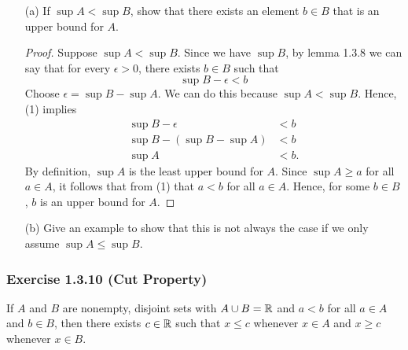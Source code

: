 \begin{enumerate}
    
    \item[(a)] If \( \sup A < \sup B \), show that there exists an element \( b \in B \) that is an upper bound for \( A \). 
    \begin{proof}
        Suppose \( \sup A < \sup B \). Since we have \( \sup B \), by lemma 1.3.8 we can say that for every \( \epsilon > 0 \), there exists \( b \in B \) such that 
        \[ \sup B - \epsilon < b \tag{1} \] 
        Choose \( \epsilon = \sup B - \sup A \). We can do this because \( \sup A < \sup B \). Hence, (1) implies 
        \begin{align*} 
            \sup B - \epsilon &< b \\
            \sup B - (\sup B - \sup A ) &< b \\ 
            \sup A &< b.
        \end{align*}  
        By definition, \( \sup A \) is the least upper bound for \(A \). Since \( \sup A \geq a\) for all \( a \in A\), it follows that 
        from (1) that \( a < b \) for all \( a \in A\). Hence, for some \( b \in B \), \( b \) is an upper bound for \( A \).    




    \end{proof}
    
    \item[(b)] Give an example to show that this is not always the case if we only assume \( \sup A \leq \sup B \). 


\end{enumerate}

    \subsubsection{Exercise 1.3.10 (Cut Property)}
    If \( A \) and \( B \) are nonempty, disjoint sets with \( A \cup B = \mathbb{R} \) and \( a < b \) for all \( a \in A \) and \( b \in B \), then there exists \( c \in \mathbb{R} \) such that \( x \leq c \) whenever \( x \in A \) and \( x \geq c \) whenever \( x \in B \). 
   
